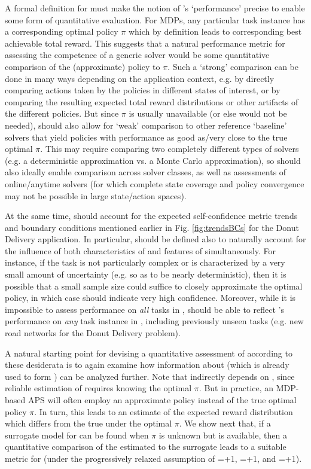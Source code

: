 A formal definition for \xQ{} must make the notion of \solve{}'s `performance' precise to enable some form of quantitative evaluation. For MDPs, any particular task instance \task{} has a corresponding optimal policy $\pi$ which by definition leads to corresponding best achievable total reward. This suggests that a natural performance metric for assessing the competence of a generic solver \solve{} would be some quantitative comparison of the (approximate) policy \tpi{} to $\pi$. Such a `strong' comparison can be done in many ways depending on the application context, e.g. by directly comparing actions taken by the policies in different states of interest, or by comparing the resulting expected total reward distributions or other artifacts of the different policies. 
But since $\pi$ is usually unavailable (or else \solve{} would not be needed), \xQ{} should also allow for `weak' comparison to other reference `baseline' solvers that yield policies with performance as good as/very close to the true optimal $\pi$. This may require comparing two completely different types of solvers (e.g. a deterministic approximation vs. a Monte Carlo approximation), so \xQ{} should also ideally enable comparison across solver classes, as well as assessments of online/anytime solvers (for which complete state coverage and policy convergence may not be possible in large state/action spaces).
 
At the same time, \xQ{} should account for the expected self-confidence metric trends and boundary conditions mentioned earlier in Fig. \ref{fig:trendsBCs} for the Donut Delivery application. In particular, \xQ{} should be defined also to naturally account for the influence of both characteristics of \solve{} and features of \task{} simultaneously. For instance, if the task \task{} is not particularly complex or is characterized by a very small amount of uncertainty (e.g. so as to be nearly deterministic), then it is possible that a small sample size could suffice to closely approximate the optimal policy, in which case \xQ{} should indicate very high confidence. Moreover, while it is impossible to assess performance on \emph{all} tasks in \taskclass{}, \xQ{} should be able to reflect \solve{}'s performance on \emph{any} task instance \task{} in \taskclass{}, including previously unseen tasks (e.g. new road networks for the Donut Delivery problem). 

A natural starting point for devising a quantitative assessment of \xQ{} according to these desiderata is to again examine how information about \pri (which is already used to form \xO{}) can be analyzed further. 
Note that \xO{} indirectly depends on \xQ{}, since reliable estimation of \ppiri requires knowing the optimal $\pi$. But in practice, an MDP-based APS will often employ an approximate policy \tpi{} instead of the true optimal policy $\pi$. In turn, this leads to an estimate \ppitri of the expected reward distribution which differs from the true \ppiri under the optimal $\pi$. We show next that, if a surrogate model for \ppiri can be found when $\pi$ is unknown but \tpi{} is available, then a quantitative comparison of the estimated \ppitri to the surrogate \ppiri leads to a suitable metric for \xQ{} (under the progressively relaxed assumption of \xM{}=+1, \xP{}=+1, and \xI{}=+1). 
    
